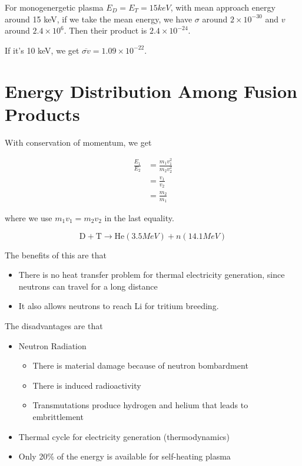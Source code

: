 \documentclass[12pt]{article}
\begin{document}
\begin{ex}
    For monogenergetic plasma $E_D = E_T = 15\unit{keV}$, with mean approach energy around 15 keV, if we take the mean energy, we have $\sigma$ around $2 \times 10^{-30}$ and $v$ around $2.4 \times 10^6$. Then their product is $2.4 \times 10^{-24}$.

    If it's 10 keV, we get $\overline{\sigma v} = 1.09 \times 10^{-22}$.
\end{ex}

\section{Energy Distribution Among Fusion Products}

With conservation of momentum, we get

\begin{align*}
    \frac{E_1}{E_2} &= \frac{m_1v_1^2}{m_2v_2^2} \\
                    &= \frac{v_1}{v_2} \\
                    &= \frac{m_2}{m_1}
\end{align*}

where we use $m_1v_1 = m_2v_2$ in the last equality.

$$\text{D} + \text{T} \rightarrow \text{He}(3.5\unit{MeV}) + n(14.1\unit{MeV})$$

The benefits of this are that

\begin{itemize}
    \item There is no heat transfer problem for thermal electricity generation, since neutrons can travel for a long distance
    \item It also allows neutrons to reach Li for tritium breeding.
\end{itemize}

The disadvantages are that

\begin{itemize}
    \item Neutron Radiation
        \begin{itemize}
            \item There is material damage because of neutron bombardment
            \item There is induced radioactivity
            \item Transmutations produce hydrogen and helium that leads to embrittlement
        \end{itemize}
    \item Thermal cycle for electricity generation (thermodynamics)
    \item Only 20\% of the energy is available for self-heating plasma
\end{itemize}
\end{document}
